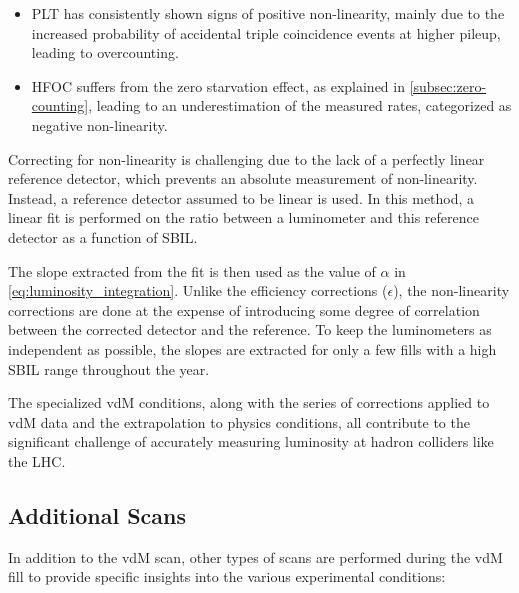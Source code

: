 \begin{itemize}
    \item PLT has consistently shown signs of positive non-linearity, mainly due to the increased probability of accidental triple coincidence events at higher pileup, leading to overcounting.
    \item HFOC suffers from the zero starvation effect, as explained in \autoref{subsec:zero-counting}, leading to an underestimation of the measured rates, categorized as negative non-linearity.
\end{itemize}

Correcting for non-linearity is challenging due to the lack of a perfectly linear reference detector, which prevents an absolute measurement of non-linearity. Instead, a reference detector assumed to be linear is used. In this method, a linear fit is performed on the ratio between a luminometer and this reference detector as a function of SBIL. 

The slope extracted from the fit is then used as the value of \(\alpha\) in \autoref{eq:luminosity_integration}. Unlike the efficiency corrections (\(\epsilon\)), the non-linearity corrections are done at the expense of introducing some degree of correlation between the corrected detector and the reference. To keep the luminometers as independent as possible, the slopes are extracted for only a few fills with a high SBIL range throughout the year.

The specialized vdM conditions, along with the series of corrections applied to vdM data and the extrapolation to physics conditions, all contribute to the significant challenge of accurately measuring luminosity at hadron colliders like the LHC.

\subsection{Additional Scans}

In addition to the vdM scan, other types of scans are performed during the vdM fill to provide specific insights into the various experimental conditions:

